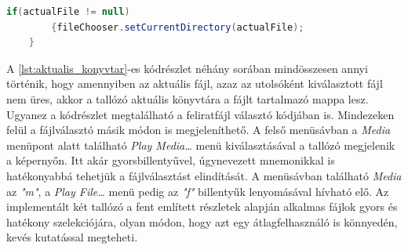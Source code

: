 \begin{spacing}{1.25}
\begin{lstlisting}[caption=Aktuális könyvtár beállítása, label={lst:aktualis_konyvtar}, language=java]
	if(actualFile != null)
	    {fileChooser.setCurrentDirectory(actualFile);
	}
\end{lstlisting}
\end{spacing}
        
A \ref{lst:aktualis_konyvtar}-es kódrészlet néhány sorában mindösszesen annyi történik, hogy amennyiben az aktuális fájl, azaz az utolsóként kiválasztott fájl nem üres, akkor a tallózó aktuális könyvtára a fájlt tartalmazó mappa lesz. Ugyanez a kódrészlet megtalálható a feliratfájl választó kódjában is. Mindezeken felül a fájlválasztó másik módon is megjeleníthető. A felső menüsávban a \textit{Media} menüpont alatt található \textit{Play Media…} menü kiválasztásával a tallózó megjelenik a képernyőn. Itt akár gyorsbillentyűvel, úgynevezett mnemonikkal is hatékonyabbá tehetjük a fájlválasztást elindítását. A menüsávban található \textit{Media} az \textit{"m"}, a \textit{Play File…} menü pedig az \textit{"f"} billentyűk lenyomásával hívható elő.
 Az implementált két tallózó a fent említett részletek alapján alkalmas fájlok gyors és hatékony szelekciójára, olyan módon, hogy azt egy átlagfelhasználó is könnyedén, kevés kutatással megteheti.
